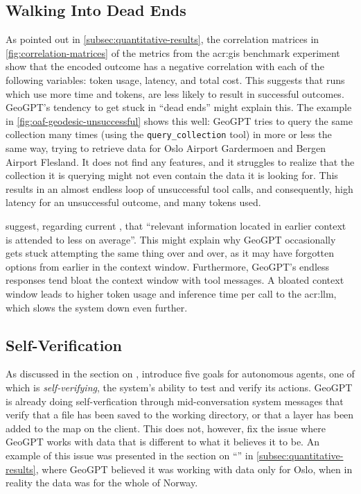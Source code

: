 \subsection[Walking Into Dead Ends]{Walking Into Dead Ends}
\label{subsec:dead-ends}

As pointed out in \autoref{subsec:quantitative-results}, the correlation matrices in \autoref{fig:correlation-matrices} of the metrics from the \acrshort{acr:gis} benchmark experiment show that the encoded outcome has a negative correlation with each of the following variables: token usage, latency, and total cost. This suggests that runs which use more time and tokens, are less likely to result in successful outcomes. GeoGPT's tendency to get stuck in \enquote{dead ends} might explain this. The example in \autoref{fig:oaf-geodesic-unsuccessful} shows this well: GeoGPT tries to query the same collection many times (using the \texttt{query\_collection} tool) in more or less the same way, trying to retrieve data for Oslo Airport Gardermoen and Bergen Airport Flesland. It does not find any features, and it struggles to realize that the collection it is querying might not even contain the data it is looking for. This results in an almost endless loop of unsuccessful tool calls, and consequently, high latency for an unsuccessful outcome, and many tokens used.

\cite{peysakhovichAttentionSortingCombats2023} suggest, regarding current , that \enquote{relevant information located in earlier context is attended to less on average}. This might explain why GeoGPT occasionally gets stuck attempting the same thing over and over, as it may have forgotten options from earlier in the context window. Furthermore, GeoGPT's endless responses tend bloat the context window with tool messages. A bloated context window leads to higher token usage and inference time per call to the \acrshort{acr:llm}, which slows the system down even further.


\subsection{Self-Verification}
\label{subsec:self-verification}

As discussed in the section on , \cite{liAutonomousGISNextgeneration2023} introduce five goals for autonomous agents, one of which is \textit{self-verifying}, the system's ability to test and verify its actions. GeoGPT is already doing self-verfication through mid-conversation system messages that verify that a file has been saved to the working directory, or that a layer has been added to the map on the client. This does not, however, fix the issue where GeoGPT works with data that is different to what it believes it to be. An example of this issue was presented in the section on \enquote{} in \autoref{subsec:quantitative-results}, where GeoGPT believed it was working with data only for Oslo, when in reality the data was for the whole of Norway.

